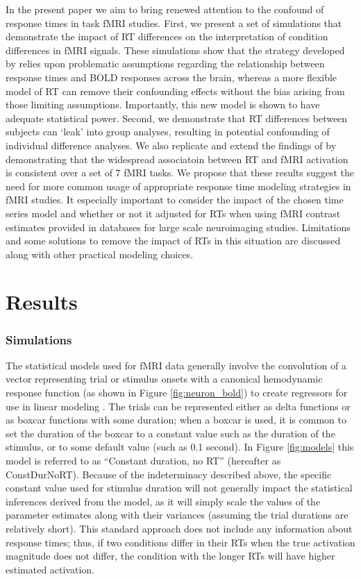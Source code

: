 \documentclass[titlepage,12pt] {article}
\begin{document}
In the present paper we aim to bring renewed attention to the confound of response times in task fMRI studies.  First, we present a set of simulations that demonstrate the impact of RT differences on the interpretation of condition differences in fMRI signals.  These simulations show that the strategy developed by \citet{grinband_detection_2008} relies upon problematic assumptions regarding the relationship between response times and BOLD responses across the brain, whereas a more flexible model of RT can remove their confounding effects without the bias arising from those limiting assumptions.  Importantly, this new model is shown to have adequate statistical power.  Second, we demonstrate that RT differences between subjects can `leak' into group analyses, resulting in potential confounding of individual difference analyses. We also replicate and extend the findings of \citet{yarkoni_bold_2009} by demonstrating that the widespread associatoin between RT and fMRI activation is consistent over a set of 7 fMRI tasks. We propose that these results suggest the need for more common usage of appropriate response time modeling strategies in fMRI studies.  It especially important to consider the impact of the chosen time series model and whether or not it adjusted for RTs when using fMRI contrast estimates provided in databases for large scale neuroimaging studies.  Limitations and some solutions to remove the impact of RTs in this situation are discussed along with other practical modeling choices.

\section*{Results}

\subsubsection*{Simulations}

The statistical models used for fMRI data generally involve the convolution of a vector representing trial or stimulus onsets with a canonical hemodynamic response function (as shown in Figure \ref{fig:neuron_bold})  to create regressors for use in linear modeling \citep{PoldrackMumfordNichols2009}.  The trials can be represented either as delta functions or as boxcar functions with some duration; when a boxcar is used, it is common to set the duration of the boxcar to a constant value such as the duration of the stimulus, or to some default value (such as 0.1 second).  In Figure \ref{fig:models} this model is referred to as ``Constant duration, no RT'' (hereafter as ConstDurNoRT).  Because of the indeterminacy described above, the specific constant value used for stimulus duration will not generally impact the statistical inferences derived from the model, as it will simply scale the values of the parameter estimates along with their variances (assuming the trial durations are relatively short).   This standard approach does not include any information about response times; thus, if two conditions differ in their RTs when the true activation magnitude does not differ, the condition with the longer RTs will have higher estimated activation.  
\end{document}
